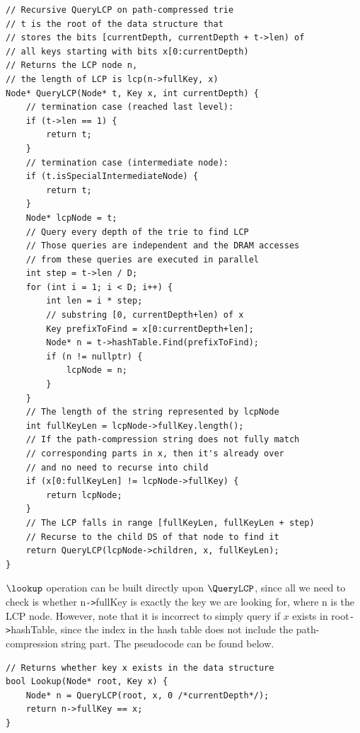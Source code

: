 \documentclass[11pt, usletter]{article}
\begin{document}
\singlespacing\begin{codebox}
\begin{verbatim}
// Recursive QueryLCP on path-compressed trie
// t is the root of the data structure that 
// stores the bits [currentDepth, currentDepth + t->len) of 
// all keys starting with bits x[0:currentDepth)
// Returns the LCP node n, 
// the length of LCP is lcp(n->fullKey, x)
Node* QueryLCP(Node* t, Key x, int currentDepth) {
    // termination case (reached last level):
    if (t->len == 1) {
        return t;
    }
    // termination case (intermediate node):
    if (t.isSpecialIntermediateNode) {
        return t;
    }
    Node* lcpNode = t;
    // Query every depth of the trie to find LCP
    // Those queries are independent and the DRAM accesses 
    // from these queries are executed in parallel
    int step = t->len / D;
    for (int i = 1; i < D; i++) {
        int len = i * step;
        // substring [0, currentDepth+len) of x
        Key prefixToFind = x[0:currentDepth+len];
        Node* n = t->hashTable.Find(prefixToFind);
        if (n != nullptr) {
            lcpNode = n;
        } 
    }
    // The length of the string represented by lcpNode
    int fullKeyLen = lcpNode->fullKey.length();
    // If the path-compression string does not fully match 
    // corresponding parts in x, then it's already over
    // and no need to recurse into child
    if (x[0:fullKeyLen] != lcpNode->fullKey) {
        return lcpNode;
    }
    // The LCP falls in range [fullKeyLen, fullKeyLen + step)
    // Recurse to the child DS of that node to find it
    return QueryLCP(lcpNode->children, x, fullKeyLen);
}
\end{verbatim}
\end{codebox}\doublespacing

$\lookup$ operation can be built directly upon $\QueryLCP$, 
since all we need to check is whether n\verb|->|fullKey is exactly the key we are looking for, 
where n is the LCP node.
However, note that it is incorrect to simply query if $x$ exists in root\verb|->|hashTable, 
since the index in the hash table does not include the path-compression string part.
The pseudocode can be found below.

\singlespacing\begin{codebox}
\begin{verbatim}
// Returns whether key x exists in the data structure
bool Lookup(Node* root, Key x) {
    Node* n = QueryLCP(root, x, 0 /*currentDepth*/);
    return n->fullKey == x;
}
\end{verbatim}
\end{codebox}\doublespacing
\end{document}
